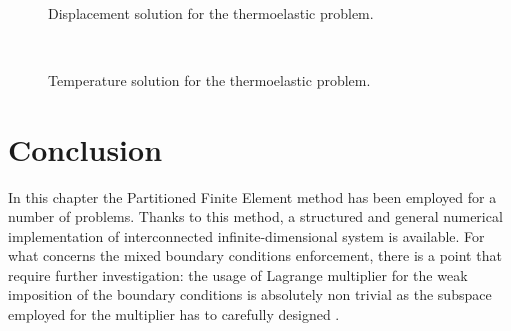\begin{figure}[htbp]%
	\centering
	\hspace{8pt}%
	 \\
	\caption[]{Displacement solution for the thermoelastic problem.}%
	\label{fig:u_therElas}%
\end{figure}

\begin{figure}[htbp]%
	\centering
	\hspace{8pt}%
	 \\
	\caption[]{Temperature solution for the thermoelastic problem.}%
	\label{fig:theta_therElas}%
\end{figure}


\section{Conclusion}
In this chapter the Partitioned Finite Element method has been employed for a number of problems.
Thanks to this method, a structured and general numerical implementation of interconnected infinite-dimensional system is available. For what concerns the mixed boundary conditions enforcement, there is a point that require further investigation: the usage of Lagrange multiplier for the weak imposition of the boundary conditions is absolutely non trivial as the subspace employed for the multiplier has to carefully designed \cite{pitkaranta1979boundary,pitkaranta1980local,pitkaranta1981finite,gunzburger1992}. 












